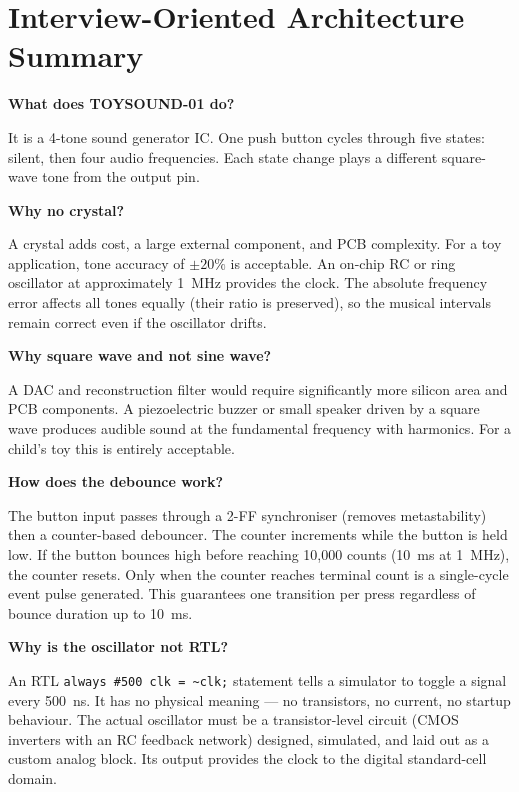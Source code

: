 \documentclass[11pt,a4paper]{article}
\begin{document}
\appendix
\section{Interview-Oriented Architecture Summary}

\textbf{What does TOYSOUND-01 do?}

It is a 4-tone sound generator IC. One push button cycles through five states: silent, then
four audio frequencies. Each state change plays a different square-wave tone from the output pin.

\textbf{Why no crystal?}

A crystal adds cost, a large external component, and PCB complexity. For a toy application,
tone accuracy of $\pm 20\%$ is acceptable. An on-chip RC or ring oscillator at approximately
1~MHz provides the clock. The absolute frequency error affects all tones equally (their ratio
is preserved), so the musical intervals remain correct even if the oscillator drifts.

\textbf{Why square wave and not sine wave?}

A DAC and reconstruction filter would require significantly more silicon area and PCB components.
A piezoelectric buzzer or small speaker driven by a square wave produces audible sound at the
fundamental frequency with harmonics. For a child's toy this is entirely acceptable.

\textbf{How does the debounce work?}

The button input passes through a 2-FF synchroniser (removes metastability) then a counter-based
debouncer. The counter increments while the button is held low. If the button bounces high before
reaching 10,000 counts (10~ms at 1~MHz), the counter resets. Only when the counter reaches
terminal count is a single-cycle event pulse generated. This guarantees one transition per press
regardless of bounce duration up to 10~ms.

\textbf{Why is the oscillator not RTL?}

An RTL \texttt{always \#500 clk = \textasciitilde{}clk;} statement tells a simulator to toggle
a signal every 500~ns. It has no physical meaning --- no transistors, no current, no startup
behaviour. The actual oscillator must be a transistor-level circuit (CMOS inverters with an
RC feedback network) designed, simulated, and laid out as a custom analog block. Its output
provides the clock to the digital standard-cell domain.
\end{document}

